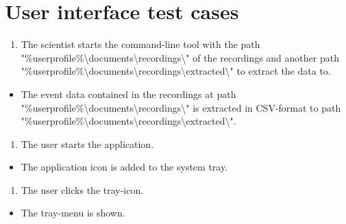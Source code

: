 \section{User interface test cases}

\begin{tests}
\setcounter{counterTC}{290}
    {\begin{enumerate}
        \item The \gls{scientist} starts the command-line tool with the path "\%userprofile\%\textbackslash documents\textbackslash recordings\textbackslash" of the recordings and another path "\%userprofile\%\textbackslash documents\textbackslash recordings\textbackslash extracted\textbackslash" to extract the data to.
    \end{enumerate}}
    {\begin{itemize}
        \item The \gls{event} data contained in the recordings at path "\%userprofile\%\textbackslash documents\textbackslash recordings\textbackslash" is extracted in CSV-format to path "\%userprofile\%\textbackslash documents\textbackslash recordings\textbackslash extracted\textbackslash".
    \end{itemize}}

    {\begin{enumerate}
        \item The \gls{user} starts the application.
    \end{enumerate}}
    {\begin{itemize}
        \item The application icon is added to the system tray.
    \end{itemize}}

    {\begin{enumerate}
        \item The \gls{user} clicks the tray-icon.
    \end{enumerate}}
    {\begin{itemize}
        \item The tray-menu is shown.
    \end{itemize}}
\end{tests}

